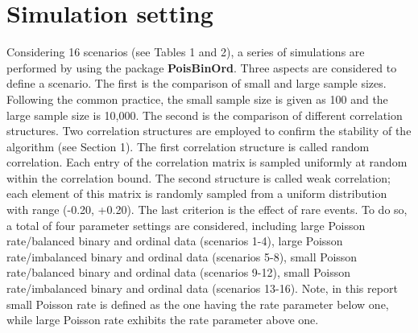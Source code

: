 \documentclass[letterpaper]{article}
\begin{document}
\section{Simulation setting}
Considering 16 scenarios (see Tables 1 and 2), a series of simulations are performed by using the package \textbf{PoisBinOrd}. Three aspects are considered to define a scenario. The first is the comparison of small and large sample sizes. Following the common practice, the small sample size is given as 100 and the large sample size is 10,000. The second is the comparison of different correlation structures. Two correlation structures are employed to confirm the stability of the algorithm (see Section 1). The first correlation structure is called random correlation. Each entry of the correlation matrix is sampled uniformly at random within the correlation bound. The second structure is called weak correlation; each element of this matrix is randomly sampled from a uniform distribution with range (-0.20, +0.20). The last criterion is the effect of rare events. To do so, a total of four parameter settings are considered, including large Poisson rate/balanced binary and ordinal data (scenarios 1-4), large Poisson rate/imbalanced binary and ordinal data (scenarios 5-8), small Poisson rate/balanced binary and ordinal data (scenarios 9-12), small Poisson rate/imbalanced binary and ordinal data (scenarios 13-16). Note, in this report small Poisson rate is defined as the one having the rate parameter below one, while large Poisson rate exhibits the rate parameter above one.
\end{document}
